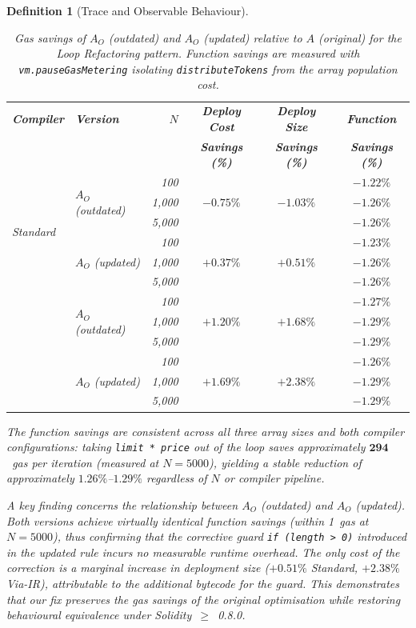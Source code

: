 \documentclass[manuscript,screen,review]{acmart}
\newtheorem{definition}{Definition}
\begin{document}
\begin{definition}[Trace and Observable Behaviour]
\begin{table}[htb]
\centering
\caption{Gas savings of $A_O$ (outdated) and $A_O$ (updated) relative to $A$ (original) for the Loop Refactoring pattern. Function savings are measured with \texttt{vm.pauseGasMetering} isolating \texttt{distributeTokens} from the array population cost.}
\label{tab:loop-refactoring-savings}
\begin{tabular}{@{}llrccc@{}}
\toprule
\textbf{Compiler} & \textbf{Version} & \textbf{$N$} & \textbf{Deploy Cost} & \textbf{Deploy Size} & \textbf{Function} \\
 & & & \textbf{Savings (\%)} & \textbf{Savings (\%)} & \textbf{Savings (\%)} \\ \midrule
\multirow{6}{*}{Standard}
 & \multirow{3}{*}{$A_O$ (outdated)}
   & 100  & \multirow{3}{*}{$-0.75\%$} & \multirow{3}{*}{$-1.03\%$} & $-1.22\%$ \\
 & & 1,000 & & & $-1.26\%$ \\
 & & 5,000 & & & $-1.26\%$ \\
\addlinespace[2pt]
 & \multirow{3}{*}{$A_O$ (updated)}
   & 100  & \multirow{3}{*}{$+0.37\%$} & \multirow{3}{*}{$+0.51\%$} & $-1.23\%$ \\
 & & 1,000 & & & $-1.26\%$ \\
 & & 5,000 & & & $-1.26\%$ \\
\addlinespace
\hline
\addlinespace
\multirow{6}{*}{Via-IR}
 & \multirow{3}{*}{$A_O$ (outdated)}
   & 100  & \multirow{3}{*}{$+1.20\%$} & \multirow{3}{*}{$+1.68\%$} & $-1.27\%$ \\
 & & 1,000 & & & $-1.29\%$ \\
 & & 5,000 & & & $-1.29\%$ \\
\addlinespace[2pt]
 & \multirow{3}{*}{$A_O$ (updated)}
   & 100  & \multirow{3}{*}{$+1.69\%$} & \multirow{3}{*}{$+2.38\%$} & $-1.26\%$ \\
 & & 1,000 & & & $-1.29\%$ \\
 & & 5,000 & & & $-1.29\%$ \\
\bottomrule
\end{tabular}
\end{table}
The function savings are consistent across all three array sizes and both compiler configurations: taking \texttt{limit~*~price} out of the loop saves approximately $\mathbf{294}$~gas per iteration (measured at $N = 5000$), yielding a stable reduction of approximately $1.26\%$--$1.29\%$ regardless of $N$ or compiler pipeline.

A key finding concerns the relationship between $A_O$ (outdated) and $A_O$ (updated). Both versions achieve virtually identical function savings (within 1~gas at $N = 5000$), thus confirming that the corrective guard \texttt{if (length > 0)} introduced in the updated rule incurs no measurable runtime overhead. The only cost of the correction is a marginal increase in deployment size ($+0.51\%$ Standard, $+2.38\%$ Via-IR), attributable to the additional bytecode for the guard. This demonstrates that our fix preserves the gas savings of the original optimisation while restoring behavioural equivalence under Solidity~$\geq$~0.8.0.


\end{definition}
\end{document}
